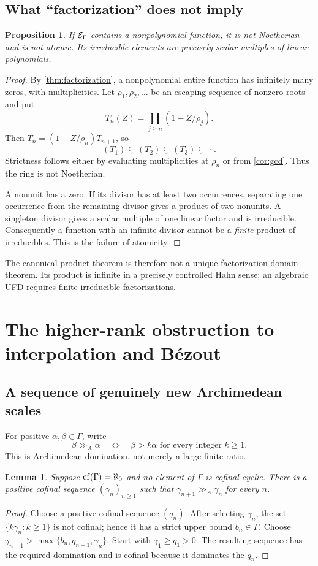 \documentclass[11pt]{article}
\theoremstyle{plain}
\newtheorem{lemma}[lemma]{Lemma}
\theoremstyle{plain}
\newtheorem{proposition}[proposition]{Proposition}
\theoremstyle{plain}
\theoremstyle{definition}
\theoremstyle{definition}
\theoremstyle{definition}
\theoremstyle{remark}
\newcommand{\ggA}{\mathrel{\gg_{\!A}}}
\begin{document}
\subsection{What ``factorization'' does not imply}
\begin{proposition}\label{prop:nonnoetherian}
If $\mathcal E_\Gamma$ contains a nonpolynomial function, it is not Noetherian and
is not atomic. Its irreducible elements are precisely scalar multiples
of linear polynomials.
\end{proposition}
\begin{proof}
By \cref{thm:factorization}, a nonpolynomial entire function has
infinitely many zeros, with multiplicities. Let $\rho_1,\rho_2,\ldots$
be an escaping sequence of nonzero roots and put
\[
 T_n(Z)=\prod_{j\ge n}(1-Z/\rho_j).
\]
Then $T_n=(1-Z/\rho_n)T_{n+1}$, so
\[
 (T_1)\subsetneq(T_2)\subsetneq(T_3)\subsetneq\cdots.
\]
Strictness follows either by evaluating multiplicities at $\rho_n$
or from \cref{cor:gcd}. Thus the ring is not Noetherian.

A nonunit has a zero. If its divisor has at least two occurrences,
separating one occurrence from the remaining divisor gives a product
of two nonunits. A singleton divisor gives a scalar multiple of one
linear factor and is irreducible. Consequently a function with an
infinite divisor cannot be a \emph{finite} product of irreducibles.
This is the failure of atomicity.
\end{proof}

The canonical product theorem is therefore not a unique-factorization-domain
theorem. Its product is infinite in a precisely controlled Hahn sense;
an algebraic UFD requires finite irreducible factorizations.

\section{The higher-rank obstruction to interpolation and B\'ezout}
\label{sec:obstruction}

\subsection{A sequence of genuinely new Archimedean scales}
For positive $\alpha,\beta\in\Gamma$, write
\[
 \beta\ggA\alpha
 \quad\Longleftrightarrow\quad
 \beta>k\alpha\text{ for every integer }k\ge1.
\]
This is Archimedean domination, not merely a large finite ratio.

\begin{lemma}\label{lem:escaping-classes}
Suppose $\operatorname{cf}(\Gamma)=\aleph_0$ and no element of $\Gamma$ is
cofinal-cyclic. There is a positive cofinal sequence $(\gamma_n)_{n\ge1}$
such that $\gamma_{n+1}\ggA\gamma_n$ for every $n$.
\end{lemma}
\begin{proof}
Choose a positive cofinal sequence $(q_n)$. After selecting
$\gamma_n$, the set $\{k\gamma_n:k\ge1\}$ is not cofinal; hence it
has a strict upper bound $b_n\in\Gamma$. Choose
$\gamma_{n+1}>\max\{b_n,q_{n+1},\gamma_n\}$.
Start with $\gamma_1\ge q_1>0$. The resulting sequence has the
required domination and is cofinal because it dominates the $q_n$.
\end{proof}
\end{document}
